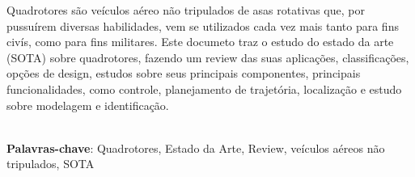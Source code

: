 \begin{thesisresumo}

Quadrotores são veículos aéreo não tripulados de asas rotativas que, por pussuírem diversas habilidades, vem se utilizados cada vez mais tanto para fins civís, como para fins militares. Este documeto traz o estudo do estado da arte (SOTA) sobre quadrotores, fazendo um review das suas aplicações, classificações, opções de design, estudos sobre seus principais componentes, principais funcionalidades, como controle, planejamento de trajetória, localização e estudo sobre modelagem e identificação.

\ \\


\textbf{Palavras-chave}: Quadrotores, Estado da Arte, Review, veículos aéreos não tripulados, SOTA

\end{thesisresumo}
